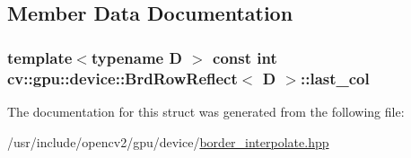 \subsection{Member Data Documentation}
\hypertarget{structcv_1_1gpu_1_1device_1_1BrdRowReflect_aed0324fea711290e56ae24adfeea4ca7}{
\subsubsection[{last\-\_\-col}]{\setlength{\rightskip}{0pt plus 5cm}template$<$typename D $>$ const int {\bf cv\-::gpu\-::device\-::\-Brd\-Row\-Reflect}$<$ D $>$\-::last\-\_\-col}}\label{structcv_1_1gpu_1_1device_1_1BrdRowReflect_aed0324fea711290e56ae24adfeea4ca7}


The documentation for this struct was generated from the following file\-:\begin{DoxyCompactItemize}
\item 
/usr/include/opencv2/gpu/device/\hyperlink{border__interpolate_8hpp}{border\-\_\-interpolate.\-hpp}\end{DoxyCompactItemize}
